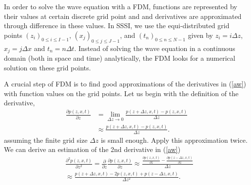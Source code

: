 \documentclass[12pt]{article}
\theoremstyle{plain}
\theoremstyle{definition}
\theoremstyle{remark}
\numberwithin{equation}{section}
\begin{document}
In order to solve the wave equation with a FDM, functions are represented by their values at certain discrete grid point and and derivatives are approximated through difference in these values. In SSSI, we use the equi-distributed grid points $(z_i)_{0\le i \le I-1 }$, $(x_j)_{0\le j \le J-1}$, and $(t_n)_{0\le n \le N-1}$ given by $z_i = i\Delta z$, $x_j = j\Delta x$ and $t_n=n\Delta t$. Instead of solving the wave equation in a continuous domain (both in space and time) analytically, the FDM looks for a numerical solution on these grid points.  

A crucial step of FDM is to find good approximations of the derivatives in (\ref{aw}) with function values on the grid points. Let us begin with the definition of the derivative, 
 \begin{equation}
  \begin{aligned}
  \frac{\partial p(z, x, t)}{\partial z} &= \lim\limits_{\Delta z \rightarrow 0} \frac{p(z+\Delta z, x, t) - p(z, x, t)}{\Delta z}\\
  &\approx \frac{p(z+\Delta z, x, t) - p(z, x, t)}{\Delta z}.
  \end{aligned}
  \end{equation}
  assuming the finite grid size $\Delta z$ is small enough.
  Apply this approximation twice. We can derive an estimation of the 2nd derivative in (\ref{aw})
  \begin{equation}
  \begin{aligned}
  &\frac{\partial^2 p(z, x, t)}{\partial z^2} = \frac{\partial}{\partial z}\frac{\partial p(z, x, t)}{\partial z} \approx \frac{\frac{\partial p(z, x, t)}{\partial z} - \frac{\partial p(z-\Delta z, x, t)}{\partial z}}{\Delta z}\\
  &\approx \frac{p(z+\Delta z, x, t) - 2p(z, x, t) + p(z-\Delta z, x, t)}{\Delta z^2}.
  \end{aligned}
  \end{equation}
  
\end{document}
